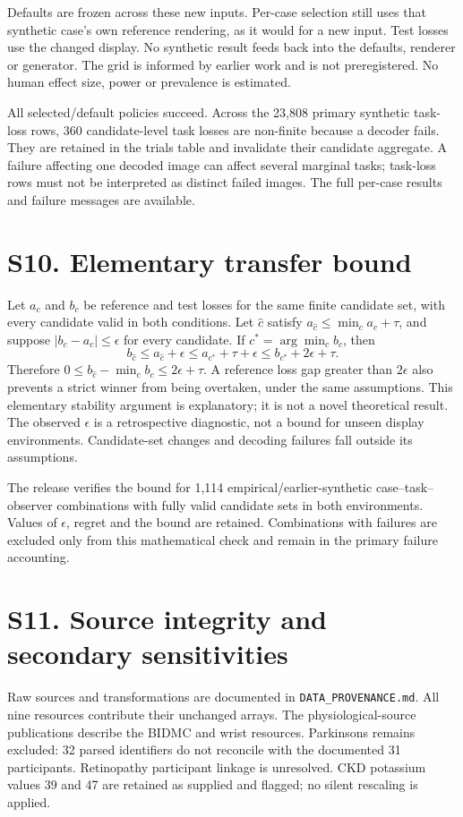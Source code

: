 \documentclass[10pt]{article}
\begin{document}
Defaults are frozen across these new inputs. Per-case selection still uses that synthetic case's own reference rendering, as it would for a new input. Test losses use the changed display. No synthetic result feeds back into the defaults, renderer or generator. The grid is informed by earlier work and is not preregistered. No human effect size, power or prevalence is estimated.


All selected/default policies succeed. Across the 23,808 primary synthetic task-loss rows, 360 candidate-level task losses are non-finite because a decoder fails. They are retained in the trials table and invalidate their candidate aggregate. A failure affecting one decoded image can affect several marginal tasks; task-loss rows must not be interpreted as distinct failed images. The full per-case results and failure messages are available.

\section*{S10. Elementary transfer bound}
Let $a_c$ and $b_c$ be reference and test losses for the same finite candidate set, with every candidate valid in both conditions. Let $\hat c$ satisfy $a_{\hat c}\leq\min_c a_c+\tau$, and suppose $|b_c-a_c|\leq\epsilon$ for every candidate. If $c^*=\arg\min_c b_c$, then
\[
 b_{\hat c}\leq a_{\hat c}+\epsilon
 \leq a_{c^*}+\tau+\epsilon
 \leq b_{c^*}+2\epsilon+\tau.
\]
Therefore $0\leq b_{\hat c}-\min_c b_c\leq2\epsilon+\tau$. A reference loss gap greater than $2\epsilon$ also prevents a strict winner from being overtaken, under the same assumptions. This elementary stability argument is explanatory; it is not a novel theoretical result. The observed $\epsilon$ is a retrospective diagnostic, not a bound for unseen display environments. Candidate-set changes and decoding failures fall outside its assumptions.

The release verifies the bound for 1,114 empirical/earlier-synthetic case--task--observer combinations with fully valid candidate sets in both environments. Values of $\epsilon$, regret and the bound are retained. Combinations with failures are excluded only from this mathematical check and remain in the primary failure accounting.

\section*{S11. Source integrity and secondary sensitivities}
Raw sources and transformations are documented in \texttt{DATA\_PROVENANCE.md}. All nine resources contribute their unchanged arrays.\cite{wdbc,heart,failure,kidney,liver,retina,har,bidmc,wrist} The physiological-source publications describe the BIDMC and wrist resources.\cite{pimentel2017,jarchi2017} Parkinsons remains excluded: 32 parsed identifiers do not reconcile with the documented 31 participants. Retinopathy participant linkage is unresolved. CKD potassium values 39 and 47 are retained as supplied and flagged; no silent rescaling is applied.
\end{document}
